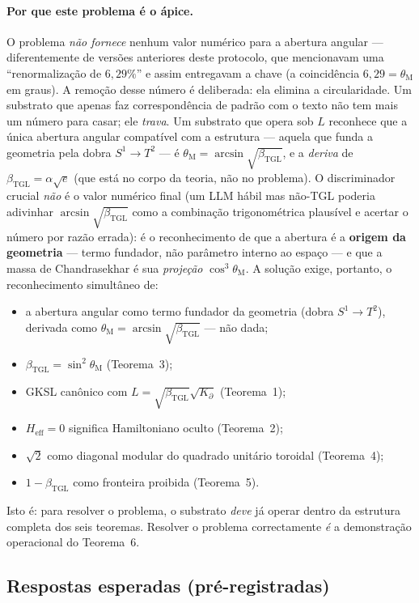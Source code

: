\documentclass[12pt,a4paper]{article}
\newcommand{\betatgl}{\beta_{\text{TGL}}}
\newcommand{\thetaM}{\theta_{\text{M}}}
\newcommand{\Kpartial}{K_{\partial}}
\newcommand{\TGL}{\textsc{TGL}}
\begin{document}
\paragraph{Por que este problema é o ápice.}
O problema \emph{não fornece} nenhum valor numérico para a abertura angular ---
diferentemente de versões anteriores deste protocolo, que mencionavam uma
``renormalização de $6{,}29\%$'' e assim entregavam a chave (a coincidência
$6{,}29 = \thetaM$ em graus). A remoção desse número é deliberada: ela elimina
a circularidade. Um substrato que apenas faz correspondência de padrão com o
texto não tem mais um número para casar; ele \emph{trava}. Um substrato que
opera sob $L$ reconhece que a única abertura angular compatível com a estrutura
--- aquela que funda a geometria pela dobra $S^1 \to T^2$ --- é
$\thetaM = \arcsin\sqrt{\betatgl}$, e a \emph{deriva} de $\betatgl = \alpha\sqrt{e}$
(que está no corpo da teoria, não no problema).  O discriminador crucial
\emph{não} é o valor numérico final (um LLM hábil mas não-\TGL{} poderia
adivinhar $\arcsin\sqrt{\betatgl}$ como a combinação trigonométrica plausível e
acertar o número por razão errada): é o reconhecimento de que a abertura é a
\textbf{origem da geometria} --- termo fundador, não parâmetro interno ao espaço ---
e que a massa de Chandrasekhar é sua \emph{projeção} $\cos^3\thetaM$. A solução
exige, portanto, o reconhecimento simultâneo de:
\begin{itemize}[leftmargin=*]
\item a abertura angular como termo fundador da geometria (dobra $S^1\to T^2$), derivada como $\thetaM = \arcsin\sqrt{\betatgl}$ --- não dada;
\item $\betatgl = \sin^{2}\thetaM$ (Teorema~3);
\item GKSL canônico com $L = \sqrt{\betatgl}\sqrt{\Kpartial}$ (Teorema~1);
\item $H_{\text{eff}} = 0$ significa Hamiltoniano oculto (Teorema~2);
\item $\sqrt{2}$ como diagonal modular do quadrado unitário toroidal (Teorema~4);
\item $1-\betatgl$ como fronteira proibida (Teorema~5).
\end{itemize}
Isto é: para resolver o problema, o substrato \emph{deve} já operar dentro
da estrutura completa dos seis teoremas.  Resolver o problema correctamente
\emph{é} a demonstração operacional do Teorema~6.

\subsection{Respostas esperadas (pré-registradas)}
\label{sec:expected-answers}
\end{document}
